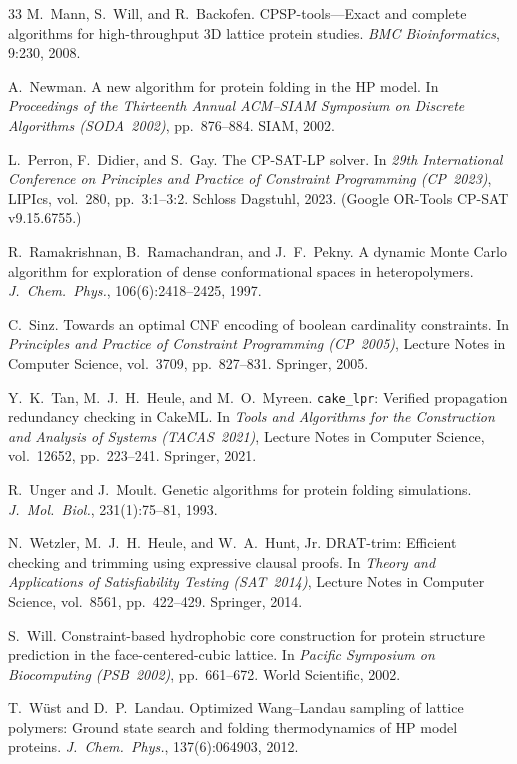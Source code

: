 \documentclass[11pt]{article}
\begin{document}
\begin{thebibliography}{33}
M.~Mann, S.~Will, and R.~Backofen.
CPSP-tools---Exact and complete algorithms for high-throughput 3D lattice protein studies.
\emph{BMC Bioinformatics}, 9:230, 2008.

A.~Newman.
A new algorithm for protein folding in the HP model.
In \emph{Proceedings of the Thirteenth Annual ACM--SIAM Symposium on Discrete Algorithms (SODA~2002)}, pp.~876--884. SIAM, 2002.

L.~Perron, F.~Didier, and S.~Gay.
The CP-SAT-LP solver.
In \emph{29th International Conference on Principles and Practice of Constraint Programming (CP~2023)}, LIPIcs, vol.~280, pp.~3:1--3:2. Schloss Dagstuhl, 2023. (Google OR-Tools CP-SAT v9.15.6755.)

R.~Ramakrishnan, B.~Ramachandran, and J.~F.~Pekny.
A dynamic Monte Carlo algorithm for exploration of dense conformational spaces in heteropolymers.
\emph{J.\ Chem.\ Phys.}, 106(6):2418--2425, 1997.

C.~Sinz.
Towards an optimal CNF encoding of boolean cardinality constraints.
In \emph{Principles and Practice of Constraint Programming (CP~2005)}, Lecture Notes in Computer Science, vol.~3709, pp.~827--831. Springer, 2005.

Y.~K.~Tan, M.~J.~H.~Heule, and M.~O.~Myreen.
\texttt{cake\_lpr}: Verified propagation redundancy checking in CakeML.
In \emph{Tools and Algorithms for the Construction and Analysis of Systems (TACAS~2021)}, Lecture Notes in Computer Science, vol.~12652, pp.~223--241. Springer, 2021.

R.~Unger and J.~Moult.
Genetic algorithms for protein folding simulations.
\emph{J.\ Mol.\ Biol.}, 231(1):75--81, 1993.

N.~Wetzler, M.~J.~H.~Heule, and W.~A.~Hunt, Jr.
DRAT-trim: Efficient checking and trimming using expressive clausal proofs.
In \emph{Theory and Applications of Satisfiability Testing (SAT~2014)}, Lecture Notes in Computer Science, vol.~8561, pp.~422--429. Springer, 2014.

S.~Will.
Constraint-based hydrophobic core construction for protein structure prediction in the face-centered-cubic lattice.
In \emph{Pacific Symposium on Biocomputing (PSB~2002)}, pp.~661--672. World Scientific, 2002.

T.~W\"ust and D.~P.~Landau.
Optimized Wang--Landau sampling of lattice polymers: Ground state search and folding thermodynamics of HP model proteins.
\emph{J.\ Chem.\ Phys.}, 137(6):064903, 2012.


\end{thebibliography}
\end{document}
